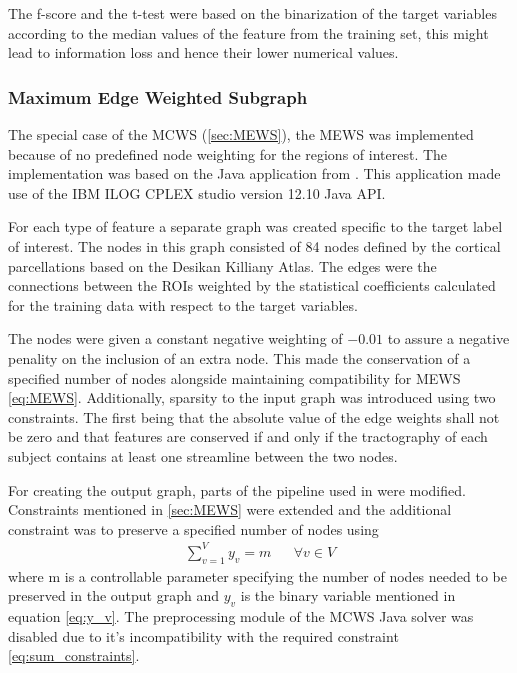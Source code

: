\documentclass[msthesis.tex]{subfiles}
\begin{document}
The f-score and the t-test were based on the binarization of the target variables according to the median values of the feature from the training set, this might lead to information loss and hence their lower numerical values. 
\fi

\subsubsection{Maximum Edge Weighted Subgraph}
\label{method:MEWS}

The special case of the MCWS (\autoref{sec:MEWS}), the MEWS was implemented because of no predefined node weighting for the regions of interest. The implementation was based on  the Java application from \cite{DBLP:journals/corr/LobodaAS16}. This application made use of the IBM ILOG CPLEX studio version 12.10 Java API. 

For each type of feature a separate graph was created specific to the target label of interest. The nodes in this graph consisted of 84 nodes defined by the cortical parcellations based on the Desikan Killiany Atlas. The edges were the connections between the ROIs weighted by the statistical coefficients calculated for the training data with respect to the target variables.

The nodes were given a constant negative weighting of $-0.01$ to assure a negative penality on the inclusion of an extra node. This made the conservation of a specified number of nodes alongside maintaining compatibility for MEWS  \autoref{eq:MEWS}. Additionally, sparsity to the input graph was introduced using two constraints. The first being that the absolute value of the edge weights shall not be zero and that features are conserved if and only if the tractography of each subject contains at least one streamline between the two nodes. 

For creating the output graph, parts of the pipeline used in \cite{DBLP:journals/corr/LobodaAS16} were modified. Constraints mentioned in \autoref{sec:MEWS} were extended and the additional constraint was to preserve a specified number of nodes using
\begin{align}
    \label{eq:sum_constraints}
    \sum_{v=1}^{V} y_v = m        &&  \forall v \in V
\end{align}
where m is a controllable parameter specifying the number of nodes needed to be preserved in the output graph and $y_v$ is the binary variable mentioned in equation \autoref{eq:y_v}. The preprocessing module of the MCWS Java solver was disabled due to it's incompatibility with the required constraint \autoref{eq:sum_constraints}.
\end{document}

